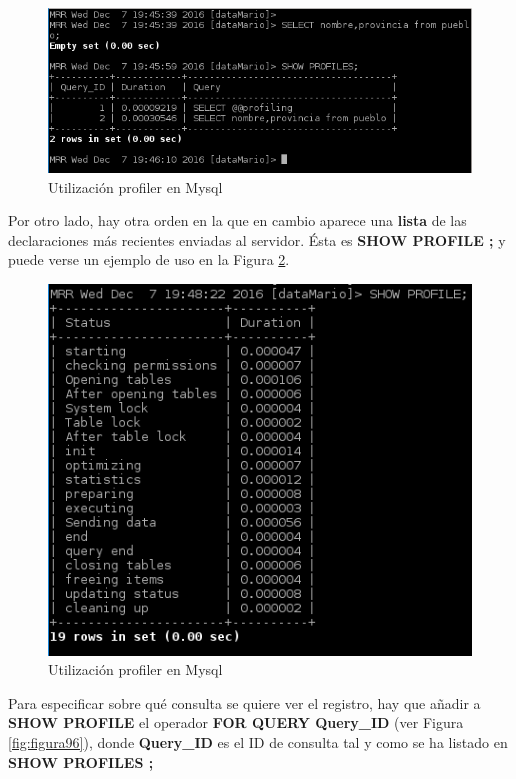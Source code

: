 \begin{figure}[H]
	\centering
	\includegraphics[scale=0.9]{figuras/ejercicio9/figura4.png} 
	\caption{Utilización profiler en Mysql} 
	\label{fig:figura94}
\end{figure}

Por otro lado, hay otra orden en la que en cambio aparece una \textbf{lista} de las declaraciones más recientes enviadas al servidor. Ésta es \textbf{SHOW PROFILE ;} \cite{enlace11} y puede verse un ejemplo de uso en la Figura \ref{fig:figura95}.

\begin{figure}[H]
	\centering
	\includegraphics[scale=0.8]{figuras/ejercicio9/figura5.png} 
	\caption{Utilización profiler en Mysql} 
	\label{fig:figura95}
\end{figure}

Para especificar sobre qué consulta se quiere ver el registro, hay que añadir a \textbf{SHOW PROFILE} el operador \textbf{FOR QUERY Query\_ID} (ver Figura \ref{fig:figura96}), donde \textbf{Query\_ID} es el ID de consulta tal y como se ha listado en \textbf{SHOW PROFILES ;}\\

